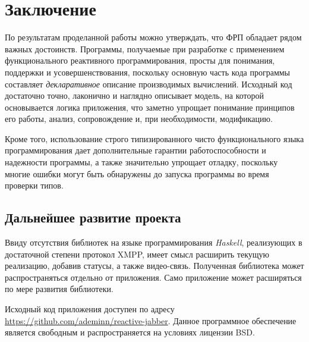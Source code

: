 \section*{Заключение}
По результатам проделанной работы можно утверждать, что ФРП обладает рядом важных достоинств.
Программы, получаемые при разработке с применением функционального реактивного программирования,
просты для понимания, поддержки и усовершенствования, поскольку основную часть кода программы составляет
\emph{декларативное} описание производимых вычислений. Исходный код достаточно точно, лаконично и
наглядно описывает модель, на которой основывается логика приложения, что заметно упрощает
понимание принципов его работы, анализ, сопровождение и, при необходимости, модификацию.

Кроме того, использование строго типизированного чисто функционального языка программирования дает
дополнительные гарантии работоспособности и надежности программы, а также значительно упрощает
отладку, поскольку многие ошибки могут быть обнаружены до запуска программы
во время проверки типов.

\subsection*{Дальнейшее развитие проекта}
Ввиду отсутствия библиотек на языке программирования \emph{Haskell}, реализующих в достаточной степени протокол XMPP,
имеет смысл расширить текущую реализацию, добавив статусы, а также видео-связь.
Полученная библиотека может распространяться отдельно от приложения.
Само приложение может расширяться по мере развития библиотеки.

Исходный код приложения доступен по адресу \url{https://github.com/ademinn/reactive-jabber}.
Данное программное обеспечение является свободным и распространяется на условиях лицензии BSD.
